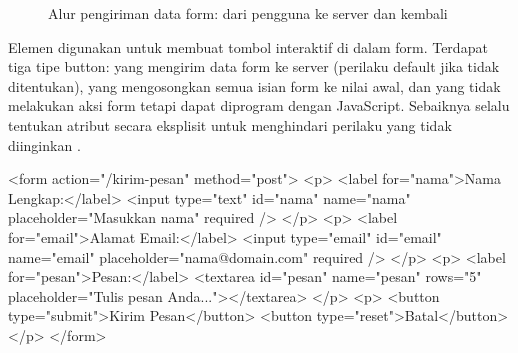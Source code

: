 \begin{figure}[H]
\centering
{}
\caption{Alur pengiriman data form: dari pengguna ke server dan kembali}
\end{figure}

Elemen  digunakan untuk membuat tombol interaktif di dalam form. Terdapat tiga tipe button:  yang mengirim data form ke server (perilaku default jika  tidak ditentukan),  yang mengosongkan semua isian form ke nilai awal, dan  yang tidak melakukan aksi form tetapi dapat diprogram dengan JavaScript. Sebaiknya selalu tentukan atribut  secara eksplisit untuk menghindari perilaku yang tidak diinginkan \cite{whatwgHtml}.

\begin{webcode}[language=HTML, caption={Form kontak lengkap dengan label dan button}]
<form action="/kirim-pesan" method="post">
  <p>
    <label for="nama">Nama Lengkap:</label>
    <input type="text" id="nama" name="nama"
           placeholder="Masukkan nama" required />
  </p>
  <p>
    <label for="email">Alamat Email:</label>
    <input type="email" id="email" name="email"
           placeholder="nama@domain.com" required />
  </p>
  <p>
    <label for="pesan">Pesan:</label>
    <textarea id="pesan" name="pesan" rows="5"
              placeholder="Tulis pesan Anda..."></textarea>
  </p>
  <p>
    <button type="submit">Kirim Pesan</button>
    <button type="reset">Batal</button>
  </p>
</form>
\end{webcode}

